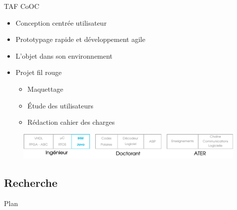 \documentclass[t,compress,mathserif,12pt,xcolor=dvipsnames]{beamer}
\begin{document}
\begin{frame}[t]{TAF CoOC}
  \begin{minipage}[t][5.0cm][t]{\textwidth}
        \begin{itemize}
          \item<+-> Conception centrée utilisateur
          \item<+-> Prototypage rapide et développement agile
          \item<+-> L'objet dans son environnement
          \item<+-> Projet fil rouge
          \begin{itemize}
            \item<+-> Maquettage
            \item<+-> \'Etude des utilisateurs
            \item<+-> Rédaction cahier des charges
          \end{itemize}
        \end{itemize}
  \end{minipage}
  \begin{figure}[htp]
    \centering
    \includegraphics[width=\textwidth]{fig/frise19}
  \end{figure}
\end{frame}

\subsection{Recherche}
\begin{frame}[t]{Plan}
  \centering
  \tableofcontents[
    currentsection,
    currentsubsection,
    sectionstyle=show/show,
    subsectionstyle=show/shaded/shaded,
  ]
\end{frame}
\end{document}
